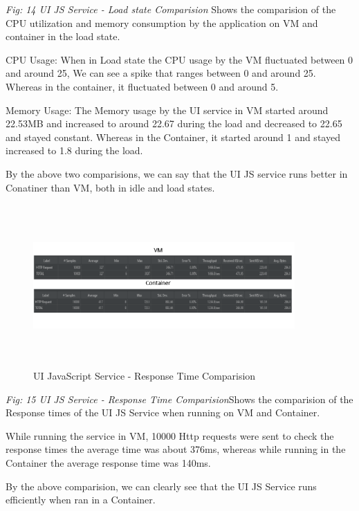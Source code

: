 \emph{Fig: 14 UI JS Service - Load state Comparision} Shows the comparision of the CPU utilization and memory consumption by the application on VM and container in the load state.

CPU Usage: When in Load state the CPU usage by the VM fluctuated between 0 and around 25, We can see a spike that ranges between 0 and around 25. Whereas in the container, it fluctuated between 0 and around 5.

Memory Usage:  The Memory usage by the UI service in VM started around 22.53MB and increased to around 22.67 during the load and decreased to 22.65 and stayed constant. Whereas in the Container, it started around 1 and stayed increased to 1.8 during the load.

By the above two comparisions, we can say that the UI JS service runs better in Conatiner than VM, both in idle and load states.
\begin{figure}[!h]
    \centering
    \includegraphics[width=10cm, height=6.2cm]{images/book-response-comp.png}
    \caption{UI JavaScript Service - Response Time Comparision}
\end{figure}

\emph{Fig: 15 UI JS Service - Response Time Comparision}Shows the comparision of the Response times of the UI JS Service when running on VM and Container.

While running the service in VM, 10000 Http requests were sent to check the response times the average time was about 376ms, whereas while running in the Container the average response time was 140ms.

By the above comparision, we can clearly see that the UI JS Service runs efficiently when ran in a Container.

